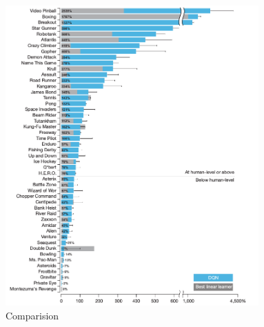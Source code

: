 \begin{figure}[h]
	\begin{center}
		\includegraphics[width=367px,height=435px]{src/img/state/comparision}
		\caption{Comparision\cite{nature}} \label{fig:comp}
    \end{center}
\end{figure}




